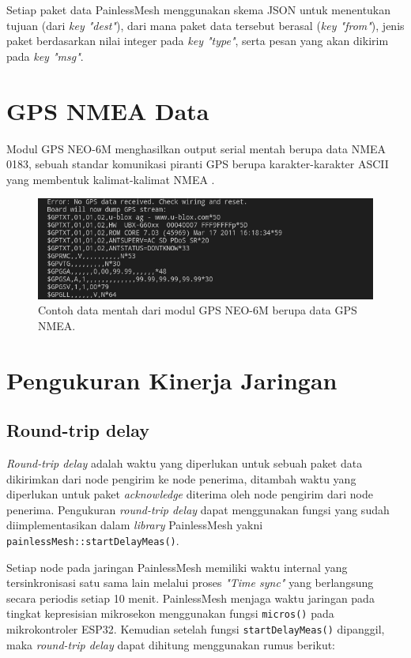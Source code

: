 Setiap paket data PainlessMesh menggunakan skema JSON untuk menentukan tujuan (dari \textit{key "dest"}), dari mana paket data tersebut berasal (\textit{key "from"}), jenis paket berdasarkan nilai integer pada \textit{key "type"}, serta pesan yang akan dikirim pada \textit{key "msg"}. \newline

\section{GPS NMEA Data}
Modul GPS NEO-6M menghasilkan output serial mentah berupa data NMEA 0183, sebuah standar komunikasi piranti GPS berupa karakter-karakter ASCII yang membentuk kalimat-kalimat NMEA \cite{GPSNMEASentence}.

\begin{figure}[H]
	\centering
	\includegraphics[scale=0.5]{./assets/NMEASentences}
	\caption{Contoh data mentah dari modul GPS NEO-6M berupa data GPS NMEA.}
\end{figure}

\section{Pengukuran Kinerja Jaringan}
\subsection{Round-trip delay}
\textit{Round-trip delay} adalah waktu yang diperlukan untuk sebuah paket data dikirimkan dari node pengirim ke node penerima, ditambah waktu yang diperlukan untuk paket \textit{acknowledge} diterima oleh node pengirim dari node penerima. Pengukuran \textit{round-trip delay} dapat menggunakan fungsi yang sudah diimplementasikan dalam \textit{library} PainlessMesh yakni \verb|painlessMesh::startDelayMeas()|.

Setiap node pada jaringan PainlessMesh memiliki waktu internal yang tersinkronisasi satu sama lain melalui proses \textit{"Time sync"} \cite{MeshProtocolWiki} yang berlangsung secara periodis setiap 10 menit. PainlessMesh menjaga waktu jaringan pada tingkat kepresisian mikrosekon menggunakan fungsi \verb|micros()| pada mikrokontroler ESP32. Kemudian setelah fungsi \verb|startDelayMeas()| dipanggil, maka \textit{round-trip delay} dapat dihitung menggunakan rumus berikut:

